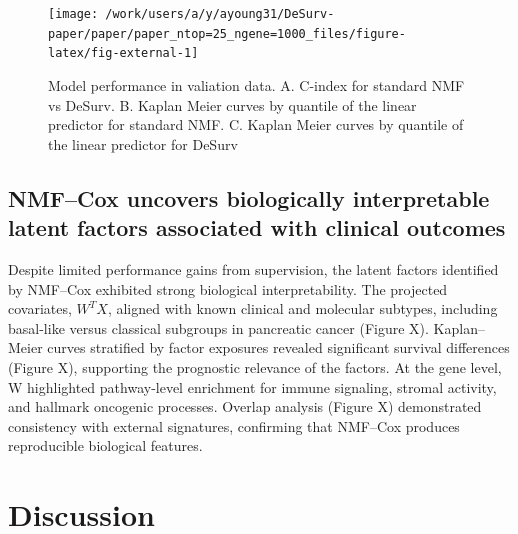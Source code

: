 \documentclass[9pt,twocolumn,twoside,]{pnas-new}
\begin{document}
\begin{figure}[t]

{\centering \texttt{[image: /work/users/a/y/ayoung31/DeSurv-paper/paper/paper\_ntop=25\_ngene=1000\_files/figure-latex/fig-external-1]} 

}

\caption{Model performance in valiation data. A. C-index for standard NMF vs DeSurv. B. Kaplan Meier curves by quantile of the linear predictor for standard NMF. C. Kaplan Meier curves by quantile of the linear predictor for DeSurv}\label{fig:fig-external}
\end{figure}

\subsection{NMF--Cox uncovers biologically interpretable latent factors
associated with clinical
outcomes}\label{nmfcox-uncovers-biologically-interpretable-latent-factors-associated-with-clinical-outcomes}

Despite limited performance gains from supervision, the latent factors
identified by NMF--Cox exhibited strong biological interpretability. The
projected covariates, \(W^TX\), aligned with known clinical and
molecular subtypes, including basal-like versus classical subgroups in
pancreatic cancer (Figure X). Kaplan--Meier curves stratified by factor
exposures revealed significant survival differences (Figure X),
supporting the prognostic relevance of the factors. At the gene level, W
highlighted pathway-level enrichment for immune signaling, stromal
activity, and hallmark oncogenic processes. Overlap analysis (Figure X)
demonstrated consistency with external signatures, confirming that
NMF--Cox produces reproducible biological features.

\section*{Discussion}\label{discussion}

\showmatmethods
\showacknow
\pnasbreak



% 
\end{document}
